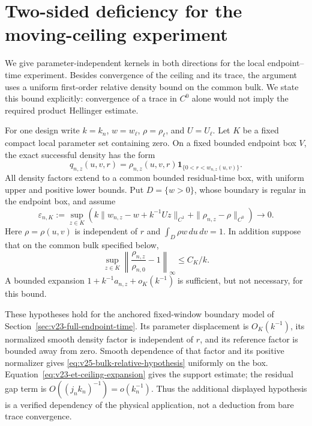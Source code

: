 \section{Two-sided deficiency for the moving-ceiling experiment}
\label{sec:v24-endpoint-time-deficiency}

We give parameter-independent kernels in both directions for the local
endpoint--time experiment.  Besides convergence of the ceiling and its trace,
the argument uses a uniform first-order relative density bound on the common
bulk.  We state this bound explicitly: convergence of a trace in \(C^0\)
alone would not imply the required product Hellinger estimate.

For one design write \(k=k_n\), \(w=w_\ell\), \(\rho=\rho_\ell\), and
\(U=U_\ell\).  Let \(K\) be a fixed compact local parameter set containing
zero.  On a fixed bounded endpoint box \(V\), the exact successful density
has the form
\[
 q_{n,z}(u,v,r)=\rho_{n,z}(u,v,r)
                  \mathbf1_{\{0<r<w_{n,z}(u,v)\}}.
\]
All density factors extend to a common bounded residual-time box, with
uniform upper and positive lower bounds.  Put \(D=\{w>0\}\), whose boundary
is regular in the endpoint box, and assume
\begin{equation}\label{eq:v24-deficiency-remainder}
 \varepsilon_{n,K}:=\sup_{z\in K}
 \left(k\|w_{n,z}-w+k^{-1}Uz\|_{C^1}
                      +\|\rho_{n,z}-\rho\|_{C^0}\right)\longrightarrow0.
\end{equation}
Here \(\rho=\rho(u,v)\) is independent of \(r\) and
\(\int_D\rho w\,du\,dv=1\).  In addition suppose that on the common bulk
specified below,
\begin{equation}\label{eq:v25-bulk-relative-hypothesis}
 \sup_{z\in K}\left\|\frac{\rho_{n,z}}{\rho_{n,0}}-1\right\|_\infty
                                                     \le C_K/k.
\end{equation}
A bounded expansion \(1+k^{-1}a_{n,z}+o_K(k^{-1})\) is sufficient, but
not necessary, for this bound.

These hypotheses hold for the anchored fixed-window boundary model of
Section~\ref{sec:v23-full-endpoint-time}.  Its parameter displacement is
\(O_K(k^{-1})\), its normalized smooth density factor is independent of
\(r\), and its reference factor is bounded away from zero.  Smooth
dependence of that factor and its positive normalizer gives
\eqref{eq:v25-bulk-relative-hypothesis} uniformly on the box.
Equation~\eqref{eq:v23-et-ceiling-expansion} gives the support estimate;
the residual gap term is \(O((j_nk_n)^{-1})=o(k_n^{-1})\).  Thus the
additional displayed hypothesis is a verified dependency of the physical
application, not a deduction from bare trace convergence.

